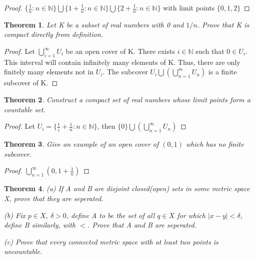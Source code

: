 \documentclass{article}
\theoremstyle{plain}
\newtheorem{theorem}{Theorem}
\theoremstyle{definition}
\begin{document}
\begin{proof}
	$\{ \frac{1}{n}: n \in \mathbb{N} \} \bigcup \{1 + \frac{1}{n}: n \in \mathbb{N}\} \bigcup \{ 2 + \frac{1}{n}: n \in \mathbb{N} \}$ with limit points $\{0,1,2\}$
\end{proof}

\begin{theorem}
	Let K be a subset of real numbers with 0 and $1/n$. Prove that K is compact directly from definition.
\end{theorem}

\begin{proof}
	Let $\bigcup_{i = 1}^{\infty} U_{i}$ be an open cover of K. There exists $i \in \mathbb{N}$ such that $0 \in U_{i}$. This interval will contain infinitely many elements of K. Thus, there are only finitely many elements not in $U_{i}$. The subcover $U_{i} \bigcup (\bigcup_{n = 1}^{m} U_{n})$ is a finite subcover of K.
\end{proof}

\begin{theorem}
	Construct a compact set of real numbers whose limit points form a countable set.
\end{theorem}

\begin{proof}
	Let $U_{i} = \{ \frac{1}{i} + \frac{1}{n}: n \in \mathbb{N} \}$, then $\{0\} \bigcup (\bigcup_{n = 1}^{\infty} U_{n})$
\end{proof}

\begin{theorem}
	Give an example of an open cover of $(0,1)$ which has no finite subcover.
\end{theorem}
\begin{proof}
	$\bigcup_{n = 1}^{\infty} (0, 1 + \frac{1}{n})$
\end{proof}

\begin{theorem}
	(a) If A and B are disjoint closed(open) sets in some metric space X, prove that they are seperated.

	(b) Fix $p \in X$, $\delta > 0$, define A to be the set of all $q \in X$ for which $| x - y | < \delta$, define B similarly, with $<$. Prove that A and B are seperated.

	(c) Prove that every connected metric space with at least two points is uncountable.

\end{theorem}
\end{document}
